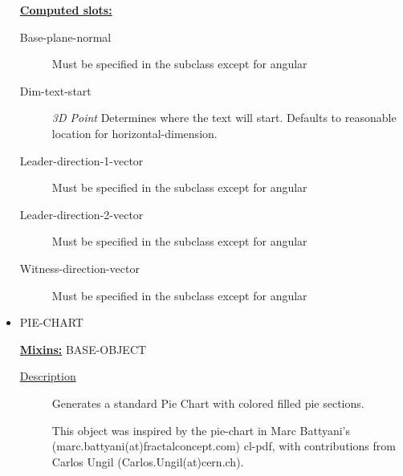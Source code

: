\documentclass [11pt]{book}
\begin{document}
\begin{itemize}
\textbf{
\underline{Computed slots:}}

\begin{description}

\item [Base-plane-normal]
Must be specified in the subclass except for angular


\item [Dim-text-start]
\emph{3D Point} Determines where the text will start. Defaults to reasonable location for
horizontal-dimension.


\item [Leader-direction-1-vector]
Must be specified in the subclass except for angular


\item [Leader-direction-2-vector]
Must be specified in the subclass except for angular


\item [Witness-direction-vector]
Must be specified in the subclass except for angular


\end{description}







\item {}PIE-CHART


\textbf{
\underline{Mixins:}} BASE-OBJECT





\begin{description}

\item [
\underline{Description}]


Generates a standard Pie Chart with colored filled pie sections.

This object was inspired by the pie-chart in Marc Battyani's (marc.battyani(at)fractalconcept.com)
cl-pdf, with contributions from Carlos Ungil (Carlos.Ungil(at)cern.ch).



\end{description}









\end{itemize}
\end{document}

